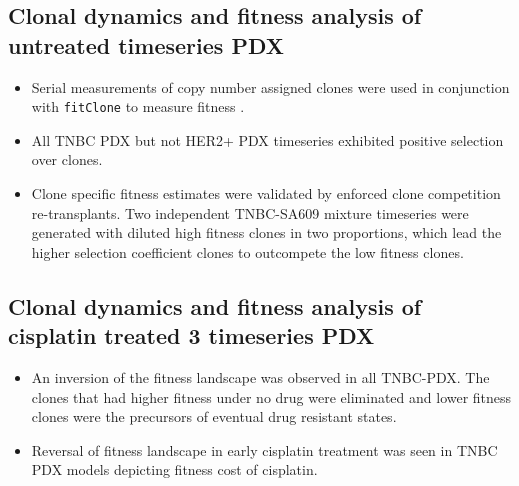 \subsection {Clonal dynamics and fitness analysis of untreated timeseries PDX}
\begin{itemize}

\item Serial measurements of copy number assigned clones were used in conjunction with \texttt{fitClone} to measure fitness \cite{salehi2020single}.

\item All TNBC PDX but not HER2+ PDX timeseries exhibited positive selection over clones.

\item Clone specific fitness estimates were validated by enforced clone competition re-transplants.
Two independent TNBC-SA609 mixture timeseries were generated with diluted high fitness clones in two proportions, which lead the higher selection coefficient clones to outcompete the low fitness clones.

 
\end{itemize} 

\subsection {Clonal dynamics and fitness analysis of cisplatin treated 3 timeseries PDX}
\begin{itemize}
 \item  An inversion of the fitness landscape was observed in all TNBC-PDX. The  clones that had higher fitness under no drug were eliminated and lower fitness clones were the precursors of eventual drug resistant states.
 
 \item Reversal of fitness landscape in early cisplatin treatment was seen in TNBC PDX models depicting fitness cost of cisplatin.
 
 \end{itemize}
 
